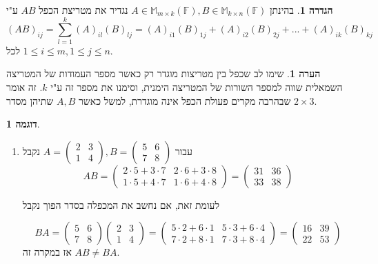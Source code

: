 \documentclass[12pt]{report}
\theoremstyle{plain}
\theoremstyle{definition}
\newtheorem{definition}[theorem]{הגדרה}
\newtheorem{example}{דוגמה}[chapter]
\newtheorem{remark}{הערה}[chapter]
\newcommand{\F}{\mathbb{F}}
\newcommand{\M}{\mathbb{M}}
\newcommand{\0}{\mathbf{0}}
\begin{document}
\begin{definition}
בהינתן
$A\in\M_{m\times k}(\F),B\in\M_{k\times n}(\F)$
נגדיר את מטריצת הכפל
$AB$
ע"י
$$
(AB)_{ij}=\sum_{l=1}^k (A)_{il}(B)_{lj}=(A)_{i1}(B)_{1j}+(A)_{i2}(B)_{2j}+...+(A)_{ik}(B)_{kj}
$$
לכל
$1\leq i\leq m, 1\leq j\leq n$.
\end{definition}

\begin{remark}
שימו לב שכפל בין מטריצות מוגדר רק כאשר מספר העמודות של המטריצה השמאלית שווה למספר השורות של המטריצה הימנית, וסימנו את מספר זה ע"י
$k$. 
זה אומר שבהרבה מקרים פעולת הכפל אינה מוגדרת, למשל כאשר
$A,B$
שתיהן מסדר
$2\times 3$.
\end{remark}

\begin{example}\
\begin{enumerate}[label=\alph*.]
\item 
עבור
$
A=\begin{pmatrix}
2 & 3 \\
1 & 4
\end{pmatrix},B=
\begin{pmatrix}
5 & 6 \\
7 & 8
\end{pmatrix}
$
נקבל
$$
AB=\begin{pmatrix}
2\cdot5 + 3\cdot7 & 2\cdot6 + 3\cdot8 \\
1\cdot5 + 4\cdot7 & 1\cdot6 + 4\cdot8
\end{pmatrix}
=
\begin{pmatrix}
31 & 36 \\
33 & 38
\end{pmatrix}
$$

לעומת זאת, אם נחשב את המכפלה בסדר הפוך נקבל

$$
BA=\begin{pmatrix}
5 & 6 \\
7 & 8
\end{pmatrix}\begin{pmatrix}
2 & 3 \\
1 & 4
\end{pmatrix}
=
\begin{pmatrix}
5\cdot2+6\cdot1 & 5\cdot3+6\cdot4 \\
7\cdot2+8\cdot1 & 7\cdot3+8\cdot4
\end{pmatrix}
=
\begin{pmatrix}
16 & 39 \\
22 & 53
\end{pmatrix}
$$
אז במקרה זה
$AB\neq BA$.



\end{enumerate}
\end{example}
\end{document}

